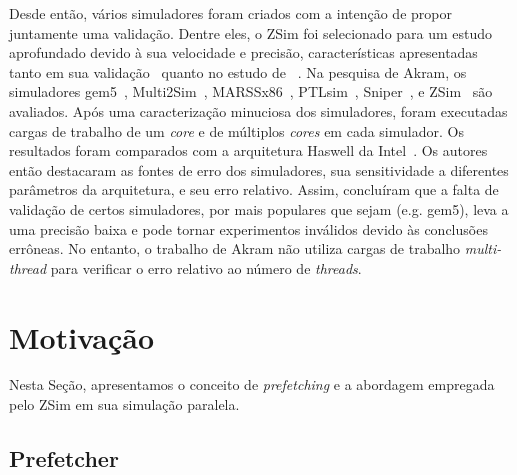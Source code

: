 \documentclass[12pt]{article}
\begin{document}
\vspace{-2mm}
Desde então, vários simuladores foram criados com a intenção de propor juntamente uma validação.
Dentre eles, o ZSim foi selecionado para um estudo aprofundado devido à sua velocidade e precisão, características apresentadas tanto em sua validação~\cite{ZSim2016validation} quanto no estudo de ~\cite{akram2019survey}.
Na pesquisa de Akram, os simuladores gem5~\cite{binkert2011gem5}, Multi2Sim~\mbox{\cite{ubal2012multi2sim}}, MARSSx86~\cite{patel2011marss}, PTLsim~\cite{yourst2007ptlsim}, Sniper~\cite{carlson2011sniper}, e ZSim~\cite{sanchez2013zsim} são avaliados. 
Após uma caracterização minuciosa dos simuladores, foram executadas cargas de trabalho de um \textit{core} e de múltiplos \textit{cores} em cada simulador. 
Os resultados foram comparados com a arquitetura Haswell da Intel~\cite{hammarlund2014haswell}. 
Os autores então destacaram as fontes de erro dos simuladores, sua sensitividade a diferentes parâmetros da arquitetura, e seu erro relativo.
Assim, concluíram que a falta de validação de certos simuladores, por mais populares que sejam (e.g. gem5), leva a uma precisão baixa e pode tornar experimentos inválidos devido às conclusões errôneas.
No entanto, o trabalho de Akram não utiliza cargas de trabalho \textit{multi-thread} para verificar o erro relativo ao número de \emph{threads}.



\vspace{-3mm}
\section{Motivação}\label{motivacao}
\vspace{-1mm}
Nesta Seção, apresentamos o conceito de \textit{prefetching} e a abordagem empregada pelo ZSim em sua simulação paralela.

\vspace{-2mm}
\subsection{Prefetcher}
\end{document}
